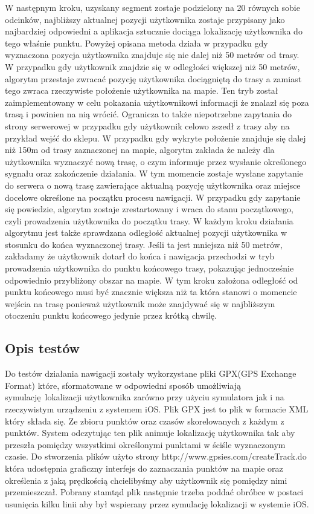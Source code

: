 W następnym kroku, uzyskany segment zostaje podzielony na 20 równych sobie odcinków, najbliższy aktualnej pozycji użytkownika zostaje przypisany jako najbardziej odpowiedni a aplikacja sztucznie dociąga lokalizację użytkownika do tego właśnie punktu.
Powyżej opisana metoda działa w przypadku gdy wyznaczona pozycja użytkownika znajduje się nie dalej niż 50 metrów od trasy. W przypadku gdy użytkownik znajdzie się w odległości większej niż 50 metrów, algorytm przestaje zwracać pozycję użytkownika dociągniętą do trasy a zamiast tego zwraca rzeczywiste położenie użytkownika na mapie. Ten tryb został zaimplementowany w celu pokazania użytkownikowi informacji że znalazł się poza trasą i powinien na nią wrócić. Ogranicza to także niepotrzebne zapytania do strony serwerowej w przypadku gdy użytkownik celowo zszedł z trasy aby na przykład wejść do sklepu.
W przypadku gdy wykryte położenie znajduje się dalej niż 150m od trasy zaznaczonej na mapie, algorytm zakłada że należy dla użytkownika wyznaczyć nową trasę, o czym informuje przez wysłanie określonego sygnału oraz zakończenie działania. W tym momencie zostaje wysłane zapytanie do serwera o nową trasę zawierające aktualną pozycję użytkownika oraz miejsce docelowe określone na początku procesu nawigacji. W przypadku gdy zapytanie się powiedzie, algorytm zostaje zrestartowany i wraca do stanu początkowego, czyli prowadzenia użytkownika do początku trasy.
W każdym kroku działania algorytmu jest także sprawdzana odległość aktualnej pozycji użytkownika w stosunku do końca wyznaczonej trasy. Jeśli ta jest mniejsza niż 50 metrów, zakładamy że użytkownik dotarł do końca i nawigacja przechodzi w tryb prowadzenia użytkownika do punktu końcowego trasy, pokazując jednocześnie odpowiednio przybliżony obszar na mapie. W tym kroku założona odległość od punktu końcowego musi być znacznie większa niż ta która stanowi o momencie wejścia na trasę ponieważ użytkownik może znajdywać się w najbliższym otoczeniu punktu końcowego jedynie przez krótką chwilę.


\subsection{Opis testów}

Do testów działania nawigacji zostały wykorzystane pliki GPX(GPS Exchange Format) które, sformatowane w odpowiedni sposób umożliwiają symulację lokalizacji użytkownika zarówno przy użyciu symulatora jak i na rzeczywistym urządzeniu z systemem iOS. Plik GPX jest to plik w formacie XML który składa się. Ze zbioru punktów oraz czasów skorelowanych z każdym z punktów. System odczytując ten plik animuje lokalizację użytkownika tak aby przeszła pomiędzy wszystkimi określonymi punktami w ściśle wyznaczonym czasie. Do stworzenia plików użyto strony http://www.gpsies.com/createTrack.do która udostępnia graficzny interfejs do zaznaczania punktów na mapie oraz określenia z jaką prędkością chcielibyśmy aby użytkownik się pomiędzy nimi przemieszczał. Pobrany stamtąd plik następnie trzeba poddać obróbce w postaci usunięcia kilku linii aby był wspierany przez symulację lokalizacji w systemie iOS.

